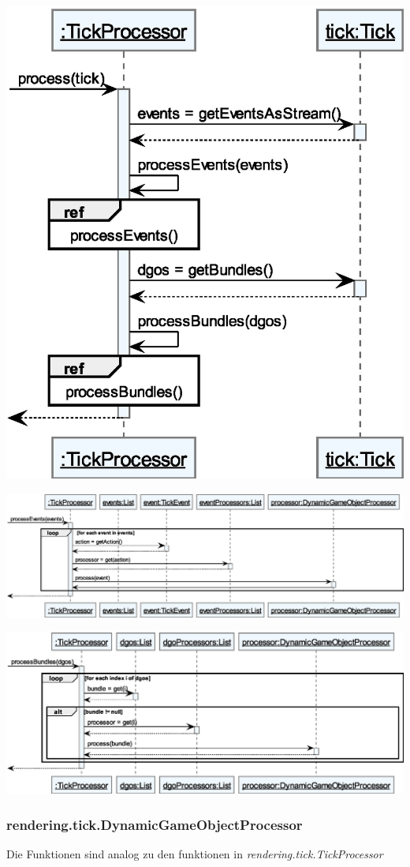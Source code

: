 \begin{center}
    \includegraphics[width=0.5\linewidth]{Interface/TickProcessor_process.eps}
\end{center}

\begin{center}
    \includegraphics[width=\linewidth]{Interface/TickProcessor_processEvents.eps}
\end{center}

\begin{center}
    \centering
    \includegraphics[width=\linewidth]{Interface/TickProcessor_processBundles.eps}
\end{center}

\subsubsection{rendering.tick.DynamicGameObjectProcessor}
Die Funktionen sind analog zu den funktionen in \textit{rendering.tick.TickProcessor}